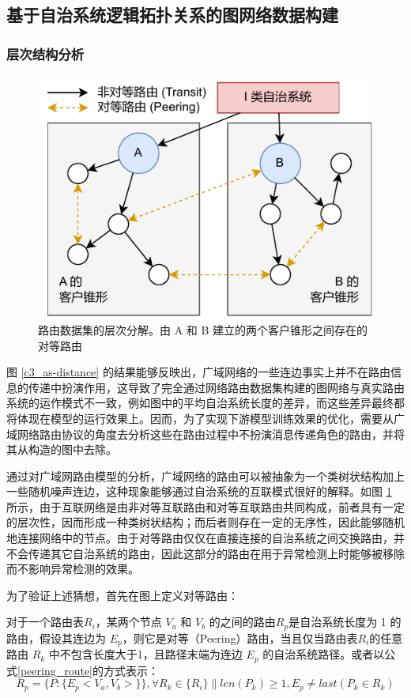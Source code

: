 \subsection{基于自治系统逻辑拓扑关系的图网络数据构建}

\subsubsection{层次结构分析}

\begin{figure}[h]
    \includegraphics[width=0.6\linewidth]{chapter/c3_images/c3_dataset-layers.pdf}
    \caption{路由数据集的层次分解。由 A 和 B 建立的两个客户锥形之间存在的对等路由}
    \label{c3_dataset-layers}
\end{figure}

图 \ref{c3_as-distance} 的结果能够反映出，广域网络的一些连边事实上并不在路由信息的传递中扮演作用，这导致了完全通过网络路由数据集构建的图网络与真实路由系统的运作模式不一致，例如图中的平均自治系统长度的差异，而这些差异最终都将体现在模型的运行效果上。因而，为了实现下游模型训练效果的优化，需要从广域网络路由协议的角度去分析这些在路由过程中不扮演消息传递角色的路由，并将其从构造的图中去除。

通过对广域网路由模型的分析，广域网络的路由可以被抽象为一个类树状结构加上一些随机噪声连边，这种现象能够通过自治系统的互联模式很好的解释。如图 \ref{c3_dataset-layers} 所示，由于互联网络是由非对等互联路由和对等互联路由共同构成，前者具有一定的层次性，因而形成一种类树状结构；而后者则存在一定的无序性，因此能够随机地连接网络中的节点。由于对等路由仅仅在直接连接的自治系统之间交换路由，并不会传递其它自治系统的路由，因此这部分的路由在用于异常检测上时能够被移除而不影响异常检测的效果。

为了验证上述猜想，首先在图上定义对等路由：

对于一个路由表${R_i}$，某两个节点 $V_a$ 和 $V_b$ 的之间的路由$R_p$是自治系统长度为 1 的路由，假设其连边为 $E_p$，则它是对等（Peering）路由，当且仅当路由表${R_i}$的任意路由 $R_k$ 中不包含长度大于1，且路径末端为连边 $E_p$ 的自治系统路径。或者以公式\ref{peering_route}的方式表示：
\begin{equation} \label{peering_route}
R_p = \{P: \{E_p<V_a, V_b>\} \}, 
\forall R_k \in \{R_i\} \parallel len(P_k) \geq 1, E_p \neq last(P_k \in R_k)
\end{equation}

